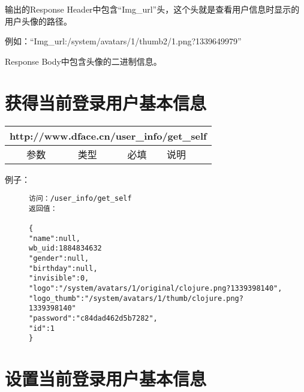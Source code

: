 \documentclass[cs4size]{ctexartutf8}
\begin{document}
输出的Response Header中包含“Img\_url”头，这个头就是查看用户信息时显示的用户头像的路径。

例如：“Img\_url:/system/avatars/1/thumb2/1.png?1339649979”

Response Body中包含头像的二进制信息。


\section{获得当前登录用户基本信息}

\begin{table}[H]
   \begin{center}
\begin{tabular}{|c|c|c|p{12cm}|}
\hline
\multicolumn{4}{|c|}{http://www.dface.cn/user\_info/get\_self} \\
\hline\hline
 \  参数  & 类型 & 必填 &  说明  \\
\hline
\end{tabular}
   \end{center}
\end{table}

例子：

\begin{figure}[H]
\begin{verbatim}
访问：/user_info/get_self
返回值：

{
"name":null,
wb_uid:1884834632
"gender":null,
"birthday":null,
"invisible":0,
"logo":"/system/avatars/1/original/clojure.png?1339398140",
"logo_thumb":"/system/avatars/1/thumb/clojure.png?1339398140"
"password":"c84dad462d5b7282",
"id":1
}

\end{verbatim}
\end{figure}



\section{设置当前登录用户基本信息}
\end{document}
